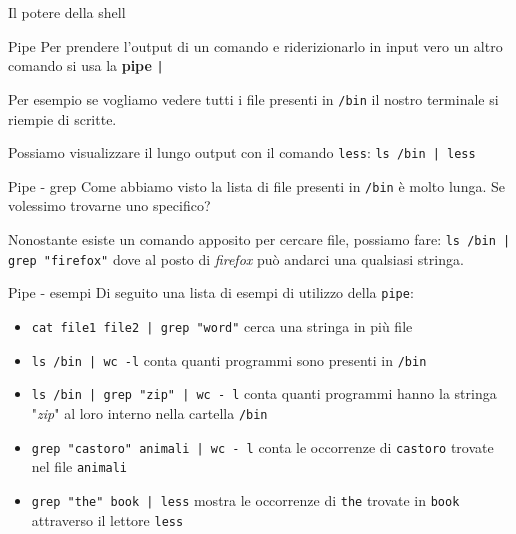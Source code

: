 \documentclass{beamer}
\begin{document}
\begin{frame}{Il potere della shell}
  \begin{figure}
  \end{figure}
\end{frame}

\begin{frame}{Pipe}
  Per prendere l'output di un comando e riderizionarlo in input vero un altro
  comando si usa la \textbf{pipe} \texttt{|}\bigskip

  Per esempio se vogliamo vedere tutti i file presenti in \texttt{/bin} il 
  nostro terminale si riempie di scritte.\bigskip

  Possiamo visualizzare il lungo output con il comando \texttt{less}: 
  \texttt{ls /bin | less}
\end{frame}

\begin{frame}{Pipe - grep}
  Come abbiamo visto la lista di file presenti in \texttt{/bin} è molto lunga.
  Se volessimo trovarne uno specifico?\pause \bigskip

  Nonostante esiste un comando apposito per cercare file, possiamo fare:
  \texttt{ls /bin | grep "firefox"} dove al posto di \textit{firefox} può 
  andarci una qualsiasi stringa.
\end{frame}

\begin{frame}{Pipe - esempi}
  Di seguito una lista di esempi di utilizzo della \texttt{pipe}:
  \begin{itemize}
    \item \texttt{cat file1 file2 | grep "word"} cerca una stringa in più file
    \item \texttt{ls /bin | wc -l} conta quanti programmi sono presenti in 
      \texttt{/bin}
    \item \texttt{ls /bin | grep "zip" | wc - l} conta quanti programmi hanno
      la stringa "\textit{zip}" al loro interno nella cartella \texttt{/bin}
    \item \texttt{grep "castoro" animali | wc - l} conta le occorrenze di 
      \texttt{castoro} trovate nel file \texttt{animali}
    \item \texttt{grep "the" book | less} mostra le occorrenze di \texttt{the} 
      trovate in \texttt{book} attraverso il lettore \texttt{less}
  \end{itemize}
\end{frame}
\end{document}

